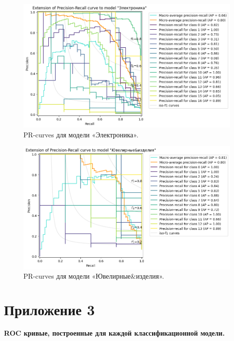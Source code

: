 \documentclass[a4paper,12pt]{extarticle}
\begin{document}
\begin{figure}[hbtp]
	\centering
	\includegraphics[scale=0.7]{pr_curves/prcurve_Электроника.png}
	\caption{PR-curves для модели «Электроника».}
	\label{fig:prcurve_Электроника}
\end{figure}

\begin{figure}[hbtp]
	\centering
	\includegraphics[scale=0.7]{pr_curves/prcurve_Ювелирные&изделия.png}
	\caption{PR-curves для модели «Ювелирные\&изделия».}
	\label{fig:prcurve_Ювелирные&изделия}
\end{figure}

\newpage
\section{Приложение 3}
\label{appendix:roc_curves}
\textbf{\large{ROC кривые, построенные для каждой классификационной модели.}}
\end{document}
